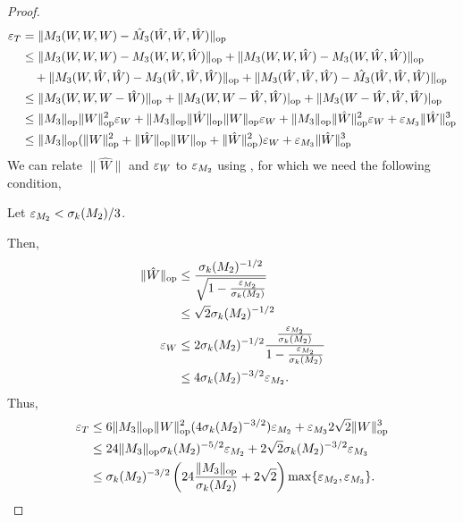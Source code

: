 \begin{proof}
\begin{align*}
  \varepsilon_{T} &= \|M_3(W,W,W) - \hat M_3(\hat W,\hat W, \hat W)\|_{\text{\rm op}} \\
           &\le 
           \| {M_3}(W,W,W) - {M_3}(W,W,\hat W) \|_{\text{\rm op}}
           + \| {M_3}(W,W,\hat W) - {M_3}(W, \hat W, \hat W)\|_{\text{\rm op}} \\
           &\quad 
           + \|{M_3}(W,\hat W,\hat W) - {M_3}(\hat W, \hat W, \hat W)\|_{\text{\rm op}} 
           + \|{M_3}(\hat W,\hat W,\hat W) - \hat {M_3}(\hat W,\hat W, \hat W)\|_{\text{\rm op}} \\
           &\le 
           \| {M_3}(W,W,W - \hat W) \|_{\text{\rm op}}
           + \| {M_3}(W,W - \hat W,\hat W) |_{\text{\rm op}} 
           + \|{M_3}(W - \hat W,\hat W,\hat W) |_{\text{\rm op}} \\
           &\le
           \| {M_3} \|_{\text{\rm op}} \|W\|^2_{\text{\rm op}} \varepsilon_{W} +
            \| {M_3} \|_{\text{\rm op}} \|\hat W\|_{\text{\rm op}} \|W\|_{\text{\rm op}} \varepsilon_{W} +
            \| {M_3} \|_{\text{\rm op}} \|\hat W\|^2_{\text{\rm op}} \varepsilon_{W} +
            \varepsilon_{M_3} \|\hat W\|^3_{\text{\rm op}}  \\
           &\le
           \| {M_3} \|_{\text{\rm op}} (\|W\|^2_{\text{\rm op}} + \|\hat W\|_{\text{\rm op}} \|W\|_{\text{\rm op}} + \|\hat W\|^2_{\text{\rm op}}) \varepsilon_{W} +
            \varepsilon_{M_3} \|\hat W\|^3_{\text{\rm op}} 
\end{align*}
We can relate $\|\hat W\|$ and $\varepsilon_{W}$ to $\varepsilon_{M_2}$ using 
, for which we need the following condition,
\begin{condition}
  Let $\varepsilon_{M_2} < \sigma_k(M_2)/3$.
\end{condition}

Then,
\begin{align*}
  \|\hat W\|_{\text{\rm op}} 
  &\le \frac{\sigma_k(M_2)^{-1/2}}{\sqrt{1 - \frac{\varepsilon_{M_2}}{\sigma_k(M_2)} }} \\
                 &\le \sqrt{2} \sigma_k(M_2)^{-1/2} \\
  \varepsilon_{W} 
  &\le 2 \sigma_k(M_2)^{-1/2} \frac{\frac{\varepsilon_{M_2}}{\sigma_k(M_2)}}{1 - \frac{\varepsilon_{M_2}}{\sigma_k(M_2)}} \\
           &\le 4 \sigma_k(M_2)^{-3/2} \varepsilon_{M_2}.
\end{align*}
Thus,
\begin{align*}
  \varepsilon_{T} &\le 
  6 \| {M_3} \|_{\text{\rm op}} \|W\|^2_{\text{\rm op}} (4 \sigma_k(M_2)^{-3/2}) \varepsilon_{M_2} +
  \varepsilon_{M_3} 2\sqrt{2} \|W\|^3_{\text{\rm op}} \\
  &\le 
  24 \| {M_3} \|_{\text{\rm op}} \sigma_k(M_2)^{-5/2} \varepsilon_{M_2} +
  2\sqrt{2} \sigma_k(M_2)^{-3/2} \varepsilon_{M_3} \\
  &\le 
    \sigma_k(M_2)^{-3/2}
      \left(24 \frac{\| {M_3} \|_{\text{\rm op}}}{\sigma_k(M_2)} + 2\sqrt{2} \right)
      \max\{ \varepsilon_{M_2}, \varepsilon_{M_3} \}.
\end{align*}


\end{proof}
